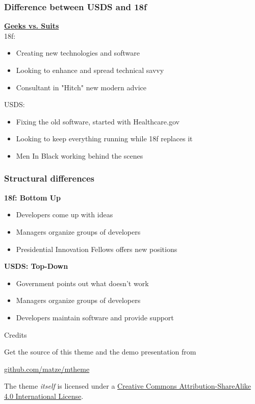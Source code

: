 \documentclass[10pt, compress]{beamer}
\begin{document}
\begin{frame}[fragile]
    \frametitle{Difference between USDS and 18f}
    \textbf{\href{http://www.nextgov.com/technology-news/tech-insider/2015/04/geeks-vs-suits-whats-real-difference-between-18f-and-usds/110818/}{Geeks vs. Suits}} \\
    18f:
    \begin{itemize}
        \item Creating new technologies and software
        \item Looking to enhance and spread technical savvy
        \item Consultant in "Hitch" new modern advice
    \end{itemize}
    USDS:
    \begin{itemize}
        \item Fixing the old software, started with Healthcare.gov
        \item Looking to keep everything running while 18f replaces it
        \item Men In Black working behind the scenes
    \end{itemize}
\end{frame}

\begin{frame}[fragile]
    \frametitle{Structural differences}
    \textbf{18f: Bottom Up}
    \begin{itemize}
        \item Developers come up with ideas
        \item Managers organize groups of developers
        \item Presidential Innovation Fellows offers new positions
    \end{itemize}
    \textbf{USDS: Top-Down}
    \begin{itemize}
        \item Government points out what doesn't work
        \item Managers organize groups of developers
        \item Developers maintain software and provide support
    \end{itemize}
\end{frame}


\begin{frame}{Credits}

  Get the source of this theme and the demo presentation from

  \begin{center}\url{github.com/matze/mtheme}\end{center}

  The theme \emph{itself} is licensed under a
  \href{http://creativecommons.org/licenses/by-sa/4.0/}{Creative Commons
  Attribution-ShareAlike 4.0 International License}.

  \begin{center}\ccbysa\end{center}

\end{frame}
\end{document}
